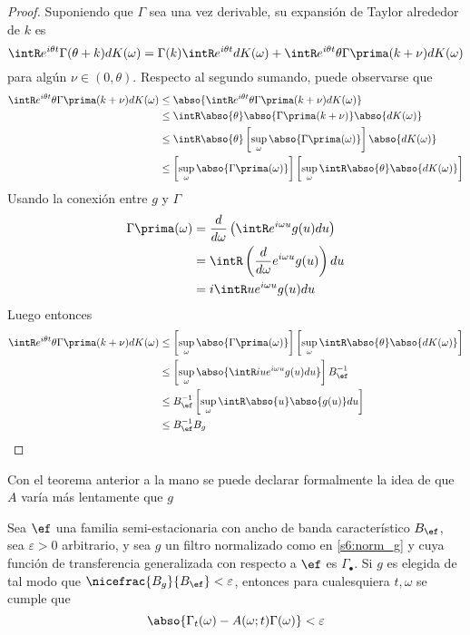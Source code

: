\begin{proof}
Suponiendo que $\Gamma$ sea una vez derivable, su expansión de Taylor alrededor de $k$ es
\begin{equation*}
\intR e^{i\theta t} \Gamma(\theta + k) dK(\omega)
= \Gamma(k) \intR e^{i \theta t} dK(\omega) + 
\intR e^{i \theta t} \theta \Gamma\prima(k + \nu) dK(\omega)
\end{equation*}
para algún $\nu \in (0,\theta)$. Respecto al segundo sumando, puede observarse que
\begin{align*}
\intR e^{i \theta t} \theta \Gamma\prima(k + \nu) dK(\omega)
&\leq
\abso{ \intR e^{i \theta t} \theta \Gamma\prima(k + \nu) dK(\omega)} \\
&\leq
\intR \abso{ \theta} \abso{ \Gamma\prima(k + \nu)} \abso{ dK(\omega)} \\
&\leq
\intR \abso{ \theta} \left[ \sup_\omega \abso{ \Gamma\prima(\omega)} \right] \abso{ dK(\omega)} \\
&\leq
\left[ \sup_\omega \abso{ \Gamma\prima(\omega)} \right]
\left[ \sup_\omega
\intR \abso{ \theta} \abso{ dK(\omega)} \right]
\end{align*}
Usando la conexión entre $g$ y $\Gamma$
\begin{align*}
\Gamma\prima(\omega) 
&= \frac{d}{d\omega} \left( \intR e^{i \omega u} g(u) du \right) \\
&= \intR \left( \frac{d}{d\omega} e^{i \omega u} g(u) \right) du \\
&= i \intR u e^{i \omega u} g(u) du \\
\end{align*}
Luego entonces
\begin{align*}
\intR e^{i \theta t} \theta \Gamma\prima(k + \nu) dK(\omega)
&\leq
\left[ \sup_\omega \abso{ \Gamma\prima(\omega)} \right] 
\left[ \sup_\omega
\intR \abso{ \theta} \abso{ dK(\omega)} \right] \\
&\leq 
\left[ \sup_\omega \abso{ \intR i u e^{i \omega u} g(u) du } \right] 
B_\ef^{-1} \\
&\leq 
B_\ef^{-1}
\left[ \sup_\omega \intR \abso{ u } \abso{ g(u)} du \right] \\
&\leq
B_\ef^{-1} B_g
\end{align*}
\end{proof}

Con el teorema anterior a la mano se puede declarar formalmente la idea de que $A$ varía más lentamente que $g$

\begin{teorema}
Sea $\ef$ una familia semi-estacionaria con ancho de banda característico $B_\ef$, sea $\varepsilon >0$ arbitrario, y sea $g$ un filtro normalizado como en \ref{s6:norm_g} y cuya función de transferencia generalizada con respecto a $\ef$ es $\Gamma_\bullet$. 
%
Si $g$ es elegida de tal modo que $\nicefrac{B_g}{B_\ef} < \varepsilon$, entonces para cualesquiera $t, \omega$ se cumple que
\begin{equation}
\abso{\Gamma_t(\omega)- A(\omega; t)\Gamma(\omega)} < \varepsilon
\end{equation}
\label{teo:aprox_gamma} 
\end{teorema}

